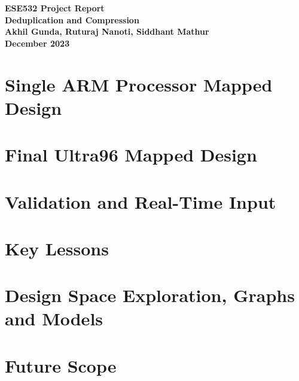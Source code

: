 \documentclass[12pt,a4paper]{article}
\begin{document}
\begin{titlepage}
    \begin{center}
        \vspace*{8cm}
        \Huge
        \textbf{ESE532 Project Report} \\
    
        \vspace*{1cm}
        \Large
        \textbf{Deduplication and Compression} \\
        
        \vspace*{1cm}
        \large
        \textbf{Akhil Gunda, Ruturaj Nanoti, Siddhant Mathur} \\
        \textbf{December 2023}
    \end{center}
\end{titlepage}

\newpage

\tableofcontents

\newpage

\section{Single ARM Processor Mapped Design}


\section{Final Ultra96 Mapped Design}


\section{Validation and Real-Time Input}


\section{Key Lessons}


\section{Design Space Exploration, Graphs and Models}


\section{Future Scope}

\end{document}
